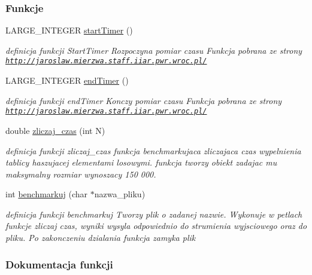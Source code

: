 \subsubsection*{Funkcje}
\begin{DoxyCompactItemize}
\item 
L\+A\+R\+G\+E\+\_\+\+I\+N\+T\+E\+G\+E\+R \hyperlink{benchmark_8hh_a4fbb2a5fceb3efd577419fc87c6f3d07}{start\+Timer} ()
\begin{DoxyCompactList}\small\item\em definicja funkcji Start\+Timer Rozpoczyna pomiar czasu Funkcja pobrana ze strony \href{http://jaroslaw.mierzwa.staff.iiar.pwr.wroc.pl/}{\tt http\+://jaroslaw.\+mierzwa.\+staff.\+iiar.\+pwr.\+wroc.\+pl/} \end{DoxyCompactList}\item 
L\+A\+R\+G\+E\+\_\+\+I\+N\+T\+E\+G\+E\+R \hyperlink{benchmark_8hh_abd320a48742faf3aa6ad1a7e7c6b518b}{end\+Timer} ()
\begin{DoxyCompactList}\small\item\em definicja funkcji end\+Timer Konczy pomiar czasu Funkcja pobrana ze strony \href{http://jaroslaw.mierzwa.staff.iiar.pwr.wroc.pl/}{\tt http\+://jaroslaw.\+mierzwa.\+staff.\+iiar.\+pwr.\+wroc.\+pl/} \end{DoxyCompactList}\item 
double \hyperlink{benchmark_8hh_abf839fc896fdc6ef6aa9b471db7aa032}{zliczaj\+\_\+czas} (int N)
\begin{DoxyCompactList}\small\item\em definicja funkcji zliczaj\+\_\+czas funkcja benchmarkujaca zliczajaca czas wypelnienia tablicy haszujacej elementami losowymi. funkcja tworzy obiekt zadajac mu maksymalny rozmiar wynoszacy 150 000. \end{DoxyCompactList}\item 
int \hyperlink{benchmark_8hh_ab611a50968dd58e80c442b968b3d39db}{benchmarkuj} (char $\ast$nazwa\+\_\+pliku)
\begin{DoxyCompactList}\small\item\em definicja funkcji benchmarkuj Tworzy plik o zadanej nazwie. Wykonuje w petlach funkcje zliczaj czas, wyniki wysyla odpowiednio do strumienia wyjsciowego oraz do pliku. Po zakonczeniu dzialania funkcja zamyka plik \end{DoxyCompactList}\end{DoxyCompactItemize}


\subsubsection{Dokumentacja funkcji}
\hypertarget{benchmark_8hh_ab611a50968dd58e80c442b968b3d39db}{}
